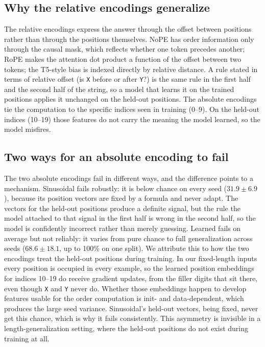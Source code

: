 \documentclass{article}
\begin{document}
\subsection{Why the relative encodings generalize}
The relative encodings express the answer through the offset between positions
rather than through the positions themselves. NoPE has order information only
through the causal mask, which reflects whether one token precedes another;
RoPE makes the attention dot product a function of the offset between two
tokens; the T5-style bias is indexed directly by relative distance. A rule stated
in terms of relative offset (is \texttt{X} before or after \texttt{Y}?) is the
same rule in the first half and the second half of the string, so a model that
learns it on the trained positions applies it unchanged on the held-out
positions. The absolute encodings tie the computation to the specific indices
seen in training (0--9). On the held-out indices (10--19) those features do not
carry the meaning the model learned, so the model misfires.

\subsection{Two ways for an absolute encoding to fail}\label{subsec:twofail}
The two absolute encodings fail in different ways, and
the difference points to a mechanism. Sinusoidal fails robustly: it is below chance
on every seed ($31.9 \pm 6.9$), because its position vectors are fixed by a formula
and never adapt. The vectors for the held-out positions produce a definite signal,
but the rule the model attached to that signal in the first half is wrong in the
second half, so the model is confidently incorrect rather than merely guessing.
Learned fails on average but not reliably: it varies from pure chance to full
generalization across seeds ($68.6 \pm 18.1$, up to 100\% on one split). We
attribute this to how the two encodings treat the held-out positions during
training. In our fixed-length inputs every position is occupied in every example,
so the learned position embeddings for indices 10--19 do receive gradient
updates, from the filler digits that sit there, even though \texttt{X} and
\texttt{Y} never do. Whether those embeddings happen to develop features usable for
the order computation is init- and data-dependent, which produces the large seed
variance. Sinusoidal's held-out vectors, being fixed, never get this chance, which
is why it fails consistently. This asymmetry is invisible in a length-generalization
setting, where the held-out positions do not exist during training at all.
\end{document}
